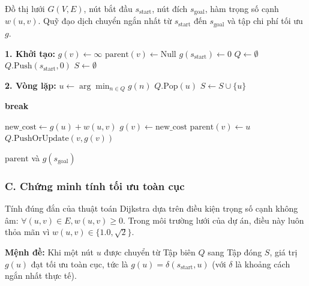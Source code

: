 \documentclass[a4paper, 12pt]{report}
\begin{document}
  \begin{algorithm}[H]
  \caption{Thuật toán Dijkstra trên không gian lưới 8-hướng}
  \begin{algorithmic}[1]
  \Require Đồ thị lưới $G(V, E)$, nút bắt đầu $s_{\text{start}}$, nút đích $s_{\text{goal}}$, hàm trọng số cạnh $w(u, v)$.
  \Ensure Quỹ đạo dịch chuyển ngắn nhất từ $s_{\text{start}}$ đến $s_{\text{goal}}$ và tập chi phí tối ưu $g$.

  \Statex \textbf{1. Khởi tạo:}
      \State $g(v) \gets \infty$
      \State $\text{parent}(v) \gets \text{Null}$
  \EndFor
  \State $g(s_{\text{start}}) \gets 0$
  \State $Q \gets \emptyset$ 
  \State $Q.\text{Push}(s_{\text{start}}, 0)$
  \State $S \gets \emptyset$ 

  \Statex \textbf{2. Vòng lặp:}
      \State $u \gets \arg\min_{n \in Q} g(n)$
      \State $Q.\text{Pop}(u)$
      \State $S \gets S \cup \{u\}$ 
      
          \State \textbf{break} 
      \EndIf
      
              \State $\text{new\_cost} \gets g(u) + w(u, v)$
                  \State $g(v) \gets \text{new\_cost}$
                  \State $\text{parent}(v) \gets u$
                  \State $Q.\text{PushOrUpdate}(v, g(v))$
              \EndIf
          \EndIf
      \EndFor
  \EndWhile

  \State \Return $\text{parent}$ và $g(s_{\text{goal}})$
  \end{algorithmic}
  \end{algorithm}

  \subsubsection{C. Chứng minh tính tối ưu toàn cục}

  Tính đúng đắn của thuật toán Dijkstra dựa trên điều kiện trọng số cạnh không âm: $\forall (u, v) \in E, w(u, v) \geq 0$. Trong môi trường lưới của dự án, điều này luôn thỏa mãn vì $w(u,v) \in \{1.0, \sqrt{2}\}$.

  \noindent\textbf{Mệnh đề:} Khi một nút $u$ được chuyển từ Tập biên $Q$ sang Tập đóng $S$, giá trị $g(u)$ đạt tối ưu toàn cục, tức là $g(u) = \delta(s_{\text{start}}, u)$ (với $\delta$ là khoảng cách ngắn nhất thực tế).
\end{document}
